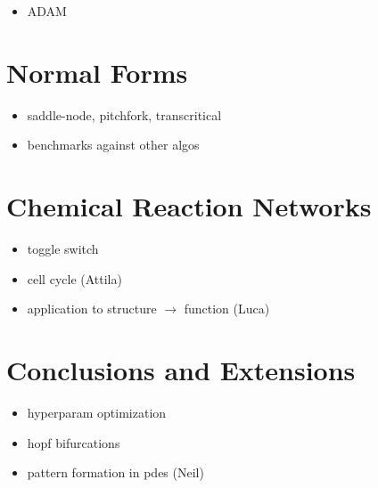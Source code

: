 \begin{itemize}
    \item ADAM
\end{itemize}

\section{Normal Forms}
\label{sec:normal-forms}

\begin{itemize}
    \item saddle-node, pitchfork, transcritical
    \item benchmarks against other algos
\end{itemize}


\section{Chemical Reaction Networks}
\label{sec:networks}

\begin{itemize}
    \item toggle switch
    \item cell cycle (Attila)
    \item application to structure $\rightarrow$ function (Luca)
\end{itemize}

\section{Conclusions and Extensions}
\label{sec:conclusions}

\begin{itemize}
    \item hyperparam optimization
    \item hopf bifurcations
    \item pattern formation in pdes (Neil)
\end{itemize}




